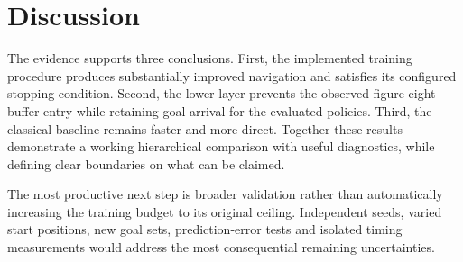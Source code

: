 \section{Discussion}
The evidence supports three conclusions. First, the implemented training procedure produces substantially improved navigation and satisfies its configured stopping condition. Second, the lower layer prevents the observed figure-eight buffer entry while retaining goal arrival for the evaluated policies. Third, the classical baseline remains faster and more direct. Together these results demonstrate a working hierarchical comparison with useful diagnostics, while defining clear boundaries on what can be claimed.

The most productive next step is broader validation rather than automatically increasing the training budget to its original ceiling. Independent seeds, varied start positions, new goal sets, prediction-error tests and isolated timing measurements would address the most consequential remaining uncertainties.
